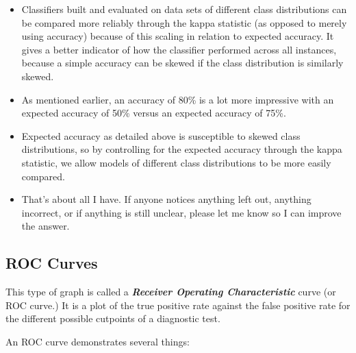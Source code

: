 \documentclass[caret-main.tex]{subfiles}
\begin{document}
\begin{itemize}
\item Classifiers built and evaluated on data sets of different class distributions can be compared more reliably through the kappa statistic (as opposed to merely using accuracy) because of this scaling in relation to expected accuracy. It gives a better indicator of how the classifier performed across all instances, because a simple accuracy can be skewed if the class distribution is similarly skewed.
\item As mentioned earlier, an accuracy of 80\% is a lot more impressive with an expected accuracy of 50\% versus an expected accuracy of 75\%. 
\item Expected accuracy as detailed above is susceptible to skewed class distributions, so by controlling for the expected accuracy through the kappa statistic, we allow models of different class distributions to be more easily compared.

\item That's about all I have. If anyone notices anything left out, anything incorrect, or if anything is still unclear, please let me know so I can improve the answer.
\end{itemize}


\newpage
\subsection{ROC Curves}


This type of graph is called a \textbf{\textit{Receiver Operating Characteristic}} curve (or ROC curve.) It is a plot of the true positive rate against the false positive rate for the different possible cutpoints of a diagnostic test.

\noindent
An ROC curve demonstrates several things:
\end{document}
